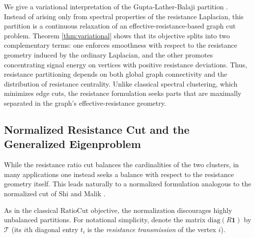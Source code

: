 \documentclass[12pt,a4paper]{amsart}
\theoremstyle{remark}
\theoremstyle{definition}
\newcommand{\1}{\mathbf{1}}
\newcommand{\0}{\mathbf{0}}
\begin{document}
We give a variational interpretation of the Gupta-Lather-Balaji partition \cite{gupta}. 
Instead of arising only from spectral properties of the resistance Laplacian, this partition is a continuous relaxation of an effective-resistance-based graph cut problem. 
Theorem \ref{thm:variational} shows that its objective splits into two complementary terms: one enforces smoothness with respect to the resistance geometry induced by the ordinary Laplacian, and the other promotes concentrating signal energy on vertices with positive resistance deviations.
Thus, resistance partitioning depends on both global graph connectivity and the distribution of resistance centrality.
Unlike classical spectral clustering, which minimizes edge cuts, the resistance formulation seeks parts that are maximally separated in the graph’s effective-resistance geometry.

    
	\subsection{Normalized Resistance Cut and the Generalized Eigenproblem}
While the resistance ratio cut balances the cardinalities of the two clusters, in many applications one instead seeks a balance with respect to the resistance geometry itself. This leads naturally to a normalized formulation analogous to the normalized cut of Shi and Malik \cite{ShiMalik2000}.

As in the classical $\mathrm{RatioCut}$ objective, the normalization discourages highly unbalanced partitions.
For notational simplicity, denote the matrix $\mathrm{diag}(R\mathbf{1})$ by $\mathcal{T}$ (its $i$th diagonal entry $t_i$ is the \emph{resistance transmission} of the vertex $i$).  
\end{document}
